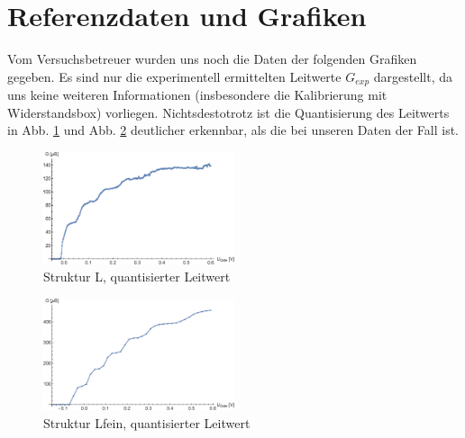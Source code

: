 \documentclass[aps,twocolumn,secnumarabic,nobalancelastpage,amsmath,amssymb,
nofootinbib,superscriptaddress]{revtex4-1}
\begin{document}
\clearpage
\appendix

\section{Referenzdaten und Grafiken}
Vom Versuchsbetreuer wurden uns noch die Daten der folgenden Grafiken gegeben.
Es sind nur die experimentell ermittelten Leitwerte $G_{exp}$ dargestellt, da uns
keine weiteren Informationen (insbesondere die Kalibrierung mit Widerstandsbox)
vorliegen. Nichtsdestotrotz ist die Quantisierung des Leitwerts in Abb. \ref{fig:l}
und Abb. \ref{fig:lfein} deutlicher erkennbar, als die bei unseren Daten der Fall ist.

\begin{figure}[h]
  \centering
  \includegraphics[width=0.5\textwidth]{Berechnung-Bilder/l.eps}
  \caption{Struktur L, quantisierter Leitwert}
  \label{fig:l}
\end{figure}

\begin{figure}[h]
  \centering
  \includegraphics[width=0.5\textwidth]{Berechnung-Bilder/lfein.eps}
  \caption{Struktur Lfein, quantisierter Leitwert}
  \label{fig:lfein}
\end{figure}


\end{document}
